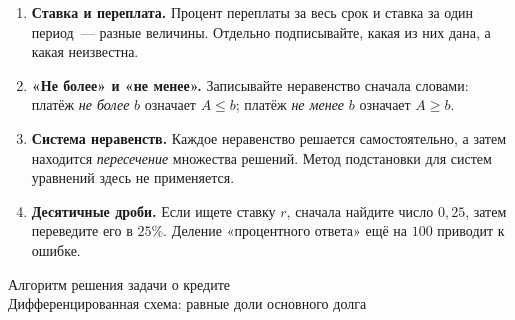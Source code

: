 \documentclass[a4paper,12pt]{article}
\begin{document}
\begin{enumerate}[label=\arabic*.]
\item \textbf{Ставка и переплата.} Процент переплаты за весь срок
и ставка за один период~--- разные величины. Отдельно подписывайте,
какая из них дана, а какая неизвестна.
\item \textbf{«Не более» и «не менее».} Записывайте неравенство
сначала словами: платёж \emph{не более} $b$ означает $A\le b$;
платёж \emph{не менее} $b$ означает $A\ge b$.
\item \textbf{Система неравенств.} Каждое неравенство решается
самостоятельно, а затем находится \emph{пересечение} множества решений.
Метод подстановки для систем уравнений здесь не применяется.
\item \textbf{Десятичные дроби.} Если ищете ставку $r$, сначала
найдите число $0{,}25$, затем переведите его в $25\%$.
Деление «процентного ответа» ещё на $100$ приводит к ошибке.
\end{enumerate}

\clearpage
\thispagestyle{fancy}
\begin{center}
{\Large\color{darkaccent}Алгоритм решения задачи о кредите}\\[3mm]
{\small Дифференцированная схема: равные доли основного долга}
\end{center}
\vspace{7mm}
\end{document}
